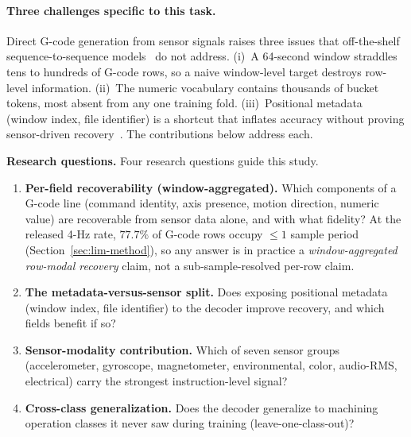 \documentclass[sensors,article,submit,moreauthors,pdftex]{Definitions/mdpi}
\begin{document}
\paragraph{Three challenges specific to this task.} Direct G-code generation from sensor signals raises three issues that off-the-shelf sequence-to-sequence models~\cite{sutskever2014sequence,bahdanau2014neural,vaswani2017attention,graves2013speech} do not address. (i)~A 64-second window straddles tens to hundreds of G-code rows, so a naive window-level target destroys row-level information. (ii)~The numeric vocabulary contains thousands of bucket tokens, most absent from any one training fold. (iii)~Positional metadata (window index, file identifier) is a shortcut that inflates accuracy without proving sensor-driven recovery~\cite{meyes2019ablation,jia2016deep}. The contributions below address each.

\textbf{Research questions.} Four research questions guide this study.
\begin{enumerate}[label=\textbf{RQ\arabic*.}, leftmargin=*]
\item \textbf{Per-field recoverability (window-aggregated).} Which components of a G-code line (command identity, axis presence, motion direction, numeric value) are recoverable from sensor data alone, and with what fidelity? At the released 4-Hz rate, $77.7\%$ of G-code rows occupy $\le\!1$ sample period (Section~\ref{sec:lim-method}), so any answer is in practice a \emph{window-aggregated row-modal recovery} claim, not a sub-sample-resolved per-row claim.
\item \textbf{The metadata-versus-sensor split.} Does exposing positional metadata (window index, file identifier) to the decoder improve recovery, and which fields benefit if so?
\item \textbf{Sensor-modality contribution.} Which of seven sensor groups (accelerometer, gyroscope, magnetometer, environmental, color, audio-RMS, electrical) carry the strongest instruction-level signal?
\item \textbf{Cross-class generalization.} Does the decoder generalize to machining operation classes it never saw during training (leave-one-class-out)?
\end{enumerate}
\end{document}
